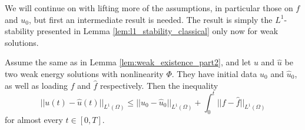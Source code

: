 \documentclass[11pt, a4paper]{article}
\begin{document}
We will continue on with lifting more of the assumptions, in particular those on $f$ and $u_0$, but first an intermediate result is needed. The result is simply the $L^1$-stability presented in Lemma \ref{lem:l1_stability_classical} only now for weak solutions.

\begin{lemma}
\label{prop:l1_stability_weak_part1}
Assume the same as in Lemma \ref{lem:weak_existence_part2}, and let $u$ and $\hat{u}$ be two weak energy solutions with nonlinearity $\Phi$. They have initial data $u_0$ and $\hat{u}_0$, as well as loading $f$ and $\hat{f}$ respectively. Then the inequality
\begin{equation}
||u(t) - \hat{u}(t)||_{L^1(\Omega)} \leq ||u_0 - \hat{u}_0||_{L^1(\Omega)} + \int_0^t||f-\hat{f}||_{L^1(\Omega)}
\end{equation}
for almost every $t\in [0,T]$.
\end{lemma}
\end{document}
